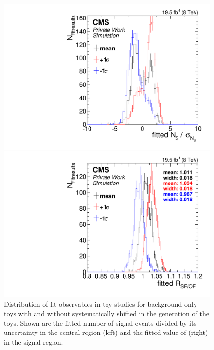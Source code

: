 \begin{figure}[!hbp]
  \centering
  \begin{minipage}[t]{0.49\textwidth}
    \includegraphics[width=\textwidth]{plots/results/fit/toyResults/nS_systShift.pdf}
  \end{minipage}
  \begin{minipage}[t]{0.49\textwidth}
    \includegraphics[width=\textwidth]{plots/results/fit/toyResults/rSFOF_systShift.pdf}
  \end{minipage}

  \caption{Distribution of fit observables in toy studies for background only toys with and without systematically shifted \Rsfof in the generation of the toys. Shown are the fitted number of signal events divided by its uncertainty in the central region (left) and the fitted value of \Rsfof (right) in the signal region.}
  \label{fig:toys:systShift}
\end{figure}
\newpage
